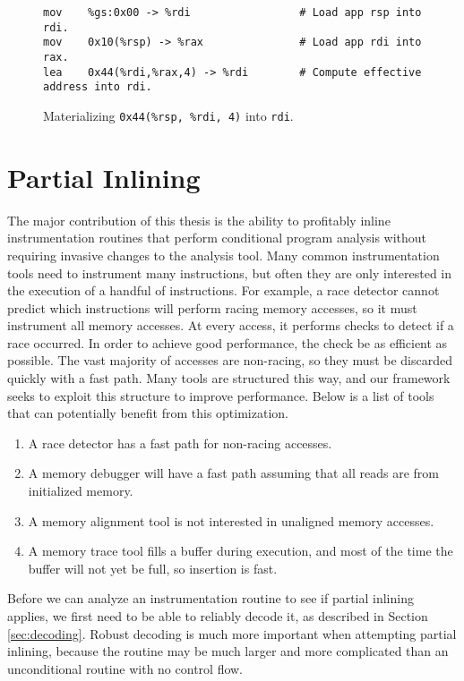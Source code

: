 \begin{figure}
\begin{verbatim}
mov    %gs:0x00 -> %rdi                 # Load app rsp into rdi.
mov    0x10(%rsp) -> %rax               # Load app rdi into rax.
lea    0x44(%rdi,%rax,4) -> %rdi        # Compute effective address into rdi.
\end{verbatim}
\caption{Materializing {\tt 0x44(\%rsp, \%rdi, 4)} into {\tt rdi}.}
\label{fig:arg_mat_lea}
\end{figure}

\section{Partial Inlining}

The major contribution of this thesis is the ability to profitably inline
instrumentation routines that perform conditional program analysis without
requiring invasive changes to the analysis tool.  Many common instrumentation
tools need to instrument many instructions, but often they are only interested
in the execution of a handful of instructions.  For example, a race detector
cannot predict which instructions will perform racing memory accesses, so it
must instrument all memory accesses.  At every access, it performs checks to
detect if a race occurred.  In order to achieve good performance, the check be
as efficient as possible.  The vast majority of accesses are non-racing, so they
must be discarded quickly with a fast path.  Many tools are structured this way,
and our framework seeks to exploit this structure to improve performance.  Below
is a list of tools that can potentially benefit from this optimization.

\begin{enumerate}
\item A race detector has a fast path for non-racing accesses.
\item A memory debugger will have a fast path assuming that all reads are from
initialized memory.
\item A memory alignment tool is not interested in unaligned memory accesses.
\item A memory trace tool fills a buffer during execution, and most of the time
the buffer will not yet be full, so insertion is fast.
\end{enumerate}

Before we can analyze an instrumentation routine to see if partial inlining
applies, we first need to be able to reliably decode it, as described in Section
\ref{sec:decoding}.  Robust decoding is much more important when attempting
partial inlining, because the routine may be much larger and more complicated
than an unconditional routine with no control flow.

